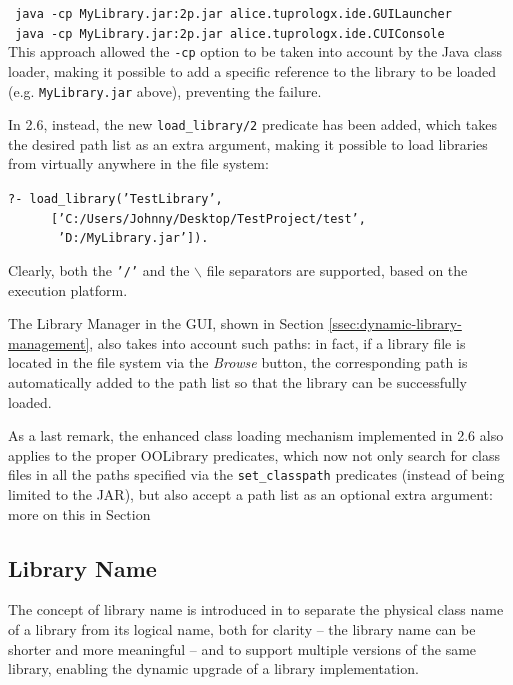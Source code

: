 \noindent \texttt{~java -cp MyLibrary.jar:2p.jar alice.tuprologx.ide.GUILauncher}\\

\noindent \texttt{~java -cp MyLibrary.jar:2p.jar alice.tuprologx.ide.CUIConsole}\\

\noindent This approach allowed the \texttt{-cp} option to be taken into account by the Java class loader, making it possible to add a specific reference to the library to be loaded (e.g. \texttt{MyLibrary.jar} above), preventing the failure.

In \tuprolog{} 2.6, instead, the new \texttt{load\_library/2} predicate has been added, which takes the desired path list as an extra argument, making it possible to load libraries from virtually anywhere in the file system:

\texttt{?- load\_library('TestLibrary',}\\
\texttt{\mbox{~~~~~~}['C:/Users/Johnny/Desktop/TestProject/test',}\\
\texttt{\mbox{~~~~~~~}'D:/MyLibrary.jar']).}

\noindent Clearly, both the \texttt{'/'} and the \texttt{$\backslash$} file separators are supported, based on the execution platform.

The Library Manager in the \tuprolog{} GUI, shown in Section \ref{ssec:dynamic-library-management}, also takes into account such paths: in fact, if a library file is located in the file system via the \textit{Browse} button, the corresponding path is automatically added to the path list so that the library can be successfully loaded.

As a last remark, the enhanced class loading mechanism implemented in \tuprolog{} 2.6 also applies to the proper OOLibrary predicates, which now not only search for class files in all the paths specified via the \texttt{set\_classpath} predicates (instead of being limited to the \tuprolog{} JAR), but also accept a path list as an optional extra argument: more on this in Section


\subsection{Library Name}
\label{ssec:library-name}

The concept of library name is introduced in \tuprolog{} to separate the physical class name of a library from its logical name, both for clarity -- the library name can be shorter and more meaningful -- and to support multiple versions of the same library, enabling the dynamic upgrade of a library implementation.

